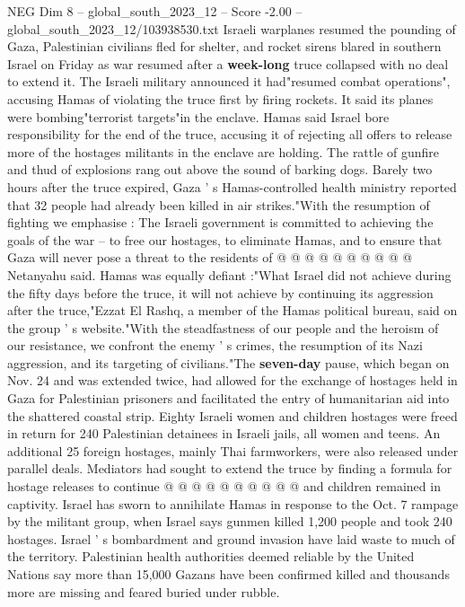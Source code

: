 \begin{textsample}{NEG Dim 8 – global\_south\_2023\_12 – Score -2.00 – global\_south\_2023\_12/103938530.txt}  \label{ex:f8_neg_017}
Israeli warplanes resumed the pounding of Gaza, Palestinian civilians fled for shelter, and rocket sirens blared in southern Israel on Friday as war resumed after a \textbf{week-long} truce collapsed with no deal to extend it.
The Israeli military announced it had"resumed combat operations", accusing Hamas of violating the truce first by firing rockets.
It said its planes were bombing"terrorist targets"in the enclave.
Hamas said Israel bore responsibility for the end of the truce, accusing it of rejecting all offers to release more of the hostages militants in the enclave are holding.
The rattle of gunfire and thud of explosions rang out above the sound of barking dogs.
Barely two hours after the truce expired, Gaza ' s Hamas-controlled health ministry reported that 32 people had already been killed in air strikes."With the resumption of fighting we emphasise : The Israeli government is committed to achieving the goals of the war -- to free our hostages, to eliminate Hamas, and to ensure that Gaza will never pose a threat to the residents of @ @ @ @ @ @ @ @ @ @ Netanyahu said.
Hamas was equally defiant :"What Israel did not achieve during the fifty days before the truce, it will not achieve by continuing its aggression after the truce,"Ezzat El Rashq, a member of the Hamas political bureau, said on the group ' s website."With the steadfastness of our people and the heroism of our resistance, we confront the enemy ' s crimes, the resumption of its Nazi aggression, and its targeting of civilians."The \textbf{seven-day} pause, which began on Nov. 24 and was extended twice, had allowed for the exchange of hostages held in Gaza for Palestinian prisoners and facilitated the entry of humanitarian aid into the shattered coastal strip.
Eighty Israeli women and children hostages were freed in return for 240 Palestinian detainees in Israeli jails, all women and teens.
An additional 25 foreign hostages, mainly Thai farmworkers, were also released under parallel deals.
Mediators had sought to extend the truce by finding a formula for hostage releases to continue @ @ @ @ @ @ @ @ @ @ and children remained in captivity.
Israel has sworn to annihilate Hamas in response to the Oct. 7 rampage by the militant group, when Israel says gunmen killed 1,200 people and took 240 hostages.
Israel ' s bombardment and ground invasion have laid waste to much of the territory.
Palestinian health authorities deemed reliable by the United Nations say more than 15,000 Gazans have been confirmed killed and thousands more are missing and feared buried under rubble.

\end{textsample}
